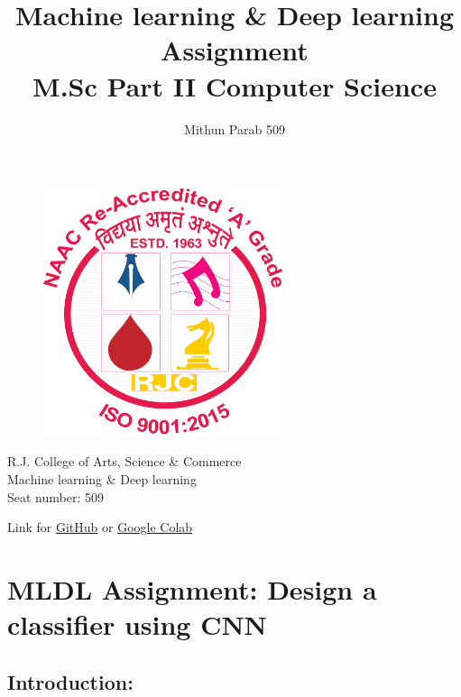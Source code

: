 \documentclass[11pt]{article}
\title{\huge{\textbf{ Machine learning \& Deep learning Assignment}} \\
    \LARGE{M.Sc Part II Computer Science}}
\author{Mithun Parab 509}
\begin{document}
    
\clearpage\maketitle
\thispagestyle{empty}
\begin{center}
    \begin{figure}[h]
        \centering
        \includegraphics[width=7cm]{RJCLG.png}
        \label{fig:logo}
    \end{figure}

    \large{R.J. College of Arts, Science \& Commerce \\
    Machine learning \& Deep learning\\
    Seat number: 509
    }
\end{center}
% 
\newpage
\tableofcontents
\begin{center}
    Link for \href{https://github.com/Mithunprb/MSc-Practicals-Journals/tree/main/MSc-Part2/MLDL/Assignment}{GitHub} or \href{https://colab.research.google.com/drive/13JoWjWJP8VqKBViF47vz_JWEHe3Xk8VG?usp=sharing}{ Google Colab}
\end{center}
\newpage
{} %
    
    \hypertarget{mldl-assignment-design-a-classifier-using-cnn}{%
\section{MLDL Assignment: Design a classifier using
CNN}\label{mldl-assignment-design-a-classifier-using-cnn}}

\hypertarget{introduction}{%
\subsection{Introduction:}\label{introduction}}
\end{document}
